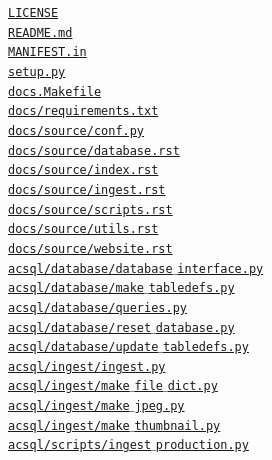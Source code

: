 \documentclass[10pt,journal,compsoc]{IEEEtran}
\begin{document}
\noindent \hyperlink{page.1}{\texttt{LICENSE}} \\
\noindent \hyperlink{page.1}{\texttt{README.md}} \\
\noindent \hyperlink{page.1}{\texttt{MANIFEST.in}} \\
\noindent \hyperlink{page.1}{\texttt{setup.py}} \\
\noindent \hyperlink{page.1}{\texttt{docs.Makefile}} \\
\noindent \hyperlink{page.1}{\texttt{docs/requirements.txt}} \\
\noindent \hyperlink{page.1}{\texttt{docs/source/conf.py}} \\
\noindent \hyperlink{page.1}{\texttt{docs/source/database.rst}} \\
\noindent \hyperlink{page.1}{\texttt{docs/source/index.rst}} \\
\noindent \hyperlink{page.1}{\texttt{docs/source/ingest.rst}} \\
\noindent \hyperlink{page.1}{\texttt{docs/source/scripts.rst}} \\
\noindent \hyperlink{page.1}{\texttt{docs/source/utils.rst}} \\
\noindent \hyperlink{page.1}{\texttt{docs/source/website.rst}} \\
\noindent \hyperlink{page.1}{\texttt{acsql/database/database$\_$interface.py}} \\
\noindent \hyperlink{page.1}{\texttt{acsql/database/make$\_$tabledefs.py}} \\
\noindent \hyperlink{page.1}{\texttt{acsql/database/queries.py}} \\
\noindent \hyperlink{page.1}{\texttt{acsql/database/reset$\_$database.py}} \\
\noindent \hyperlink{page.1}{\texttt{acsql/database/update$\_$tabledefs.py}} \\
\noindent \hyperlink{page.1}{\texttt{acsql/ingest/ingest.py}} \\
\noindent \hyperlink{page.1}{\texttt{acsql/ingest/make$\_$file$\_$dict.py}} \\
\noindent \hyperlink{page.1}{\texttt{acsql/ingest/make$\_$jpeg.py}} \\
\noindent \hyperlink{page.1}{\texttt{acsql/ingest/make$\_$thumbnail.py}} \\
\noindent \hyperlink{page.1}{\texttt{acsql/scripts/ingest$\_$production.py}} \\
\end{document}
